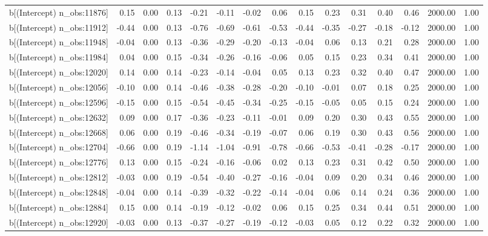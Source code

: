 \begin{table}[ht]
\begin{tabular}{rrrrrrrrrrrrrrr}
  b[(Intercept) n\_obs:11876] & 0.15 & 0.00 & 0.13 & -0.21 & -0.11 & -0.02 & 0.06 & 0.15 & 0.23 & 0.31 & 0.40 & 0.46 & 2000.00 & 1.00 \\ 
  b[(Intercept) n\_obs:11912] & -0.44 & 0.00 & 0.13 & -0.76 & -0.69 & -0.61 & -0.53 & -0.44 & -0.35 & -0.27 & -0.18 & -0.12 & 2000.00 & 1.00 \\ 
  b[(Intercept) n\_obs:11948] & -0.04 & 0.00 & 0.13 & -0.36 & -0.29 & -0.20 & -0.13 & -0.04 & 0.06 & 0.13 & 0.21 & 0.28 & 2000.00 & 1.00 \\ 
  b[(Intercept) n\_obs:11984] & 0.04 & 0.00 & 0.15 & -0.34 & -0.26 & -0.16 & -0.06 & 0.05 & 0.15 & 0.23 & 0.34 & 0.41 & 2000.00 & 1.00 \\ 
  b[(Intercept) n\_obs:12020] & 0.14 & 0.00 & 0.14 & -0.23 & -0.14 & -0.04 & 0.05 & 0.13 & 0.23 & 0.32 & 0.40 & 0.47 & 2000.00 & 1.00 \\ 
  b[(Intercept) n\_obs:12056] & -0.10 & 0.00 & 0.14 & -0.46 & -0.38 & -0.28 & -0.20 & -0.10 & -0.01 & 0.07 & 0.18 & 0.25 & 2000.00 & 1.00 \\ 
  b[(Intercept) n\_obs:12596] & -0.15 & 0.00 & 0.15 & -0.54 & -0.45 & -0.34 & -0.25 & -0.15 & -0.05 & 0.05 & 0.15 & 0.24 & 2000.00 & 1.00 \\ 
  b[(Intercept) n\_obs:12632] & 0.09 & 0.00 & 0.17 & -0.36 & -0.23 & -0.11 & -0.01 & 0.09 & 0.20 & 0.30 & 0.43 & 0.55 & 2000.00 & 1.00 \\ 
  b[(Intercept) n\_obs:12668] & 0.06 & 0.00 & 0.19 & -0.46 & -0.34 & -0.19 & -0.07 & 0.06 & 0.19 & 0.30 & 0.43 & 0.56 & 2000.00 & 1.00 \\ 
  b[(Intercept) n\_obs:12704] & -0.66 & 0.00 & 0.19 & -1.14 & -1.04 & -0.91 & -0.78 & -0.66 & -0.53 & -0.41 & -0.28 & -0.17 & 2000.00 & 1.00 \\ 
  b[(Intercept) n\_obs:12776] & 0.13 & 0.00 & 0.15 & -0.24 & -0.16 & -0.06 & 0.02 & 0.13 & 0.23 & 0.31 & 0.42 & 0.50 & 2000.00 & 1.00 \\ 
  b[(Intercept) n\_obs:12812] & -0.03 & 0.00 & 0.19 & -0.54 & -0.40 & -0.27 & -0.16 & -0.04 & 0.09 & 0.20 & 0.34 & 0.46 & 2000.00 & 1.00 \\ 
  b[(Intercept) n\_obs:12848] & -0.04 & 0.00 & 0.14 & -0.39 & -0.32 & -0.22 & -0.14 & -0.04 & 0.06 & 0.14 & 0.24 & 0.36 & 2000.00 & 1.00 \\ 
  b[(Intercept) n\_obs:12884] & 0.15 & 0.00 & 0.14 & -0.19 & -0.12 & -0.02 & 0.06 & 0.15 & 0.25 & 0.34 & 0.44 & 0.51 & 2000.00 & 1.00 \\ 
  b[(Intercept) n\_obs:12920] & -0.03 & 0.00 & 0.13 & -0.37 & -0.27 & -0.19 & -0.12 & -0.03 & 0.05 & 0.12 & 0.22 & 0.32 & 2000.00 & 1.00 \\ 

\end{tabular}
\end{table}
